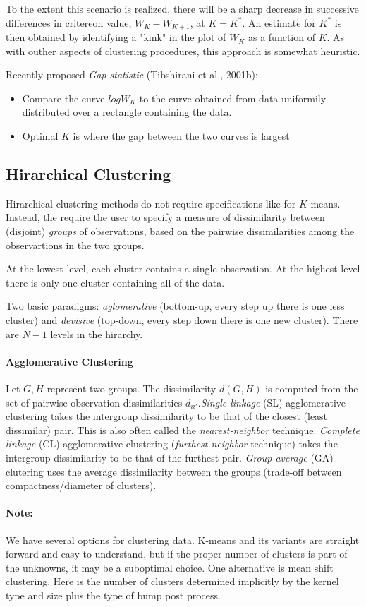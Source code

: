 To the extent this scenario is realized, there will be a sharp decrease in successive differences in critereon value, \(W_K - W_{K+1}\), at \(K=K^*\). An estimate for \(K^*\) is then obtained by identifying a "kink" in the plot of \(W_K\) as a function of \(K\). As with outher aspects of clustering procedures, this approach is somewhat heuristic.

Recently proposed \textit{Gap statistic} (Tibshirani et al., 2001b):
\begin{itemize}
    \item
        Compare the curve \(log W_K\) to the curve obtained from data uniformily distributed over a rectangle containing the data.
    \item
        Optimal \(K\) is where the gap between the two curves is largest
\end{itemize}

\subsection*{Hirarchical Clustering}
Hirarchical clustering methods do not require specifications like for \(K\)-means. Instead, the require the user to specify a measure of dissimilarity between (disjoint) \textit{groups} of observations, based on the pairwise dissimilarities among the observartions in the two groups.

At the lowest level, each cluster contains a single observation. At the highest level there is only one cluster containing all of the data.

Two basic paradigms: \textit{aglomerative} (bottom-up, every step up there is one less cluster) and \textit{devisive} (top-down, every step down there is one new cluster). There are \(N-1\) levels in the hirarchy.

\paragraph{Agglomerative Clustering}
Let \(G, H\) represent two groups. The dissimilarity \(d(G,H)\) is computed from the set of pairwise observation dissimilarities \(d_{ii'}\).\textit{Single linkage} (SL) agglomerative clustering takes the intergroup dissimilarity to be that of the closest (least dissimilar) pair. This is also often called the \textit{nearest-neighbor} technique. \textit{Complete linkage} (CL) agglomerative clustering (\textit{furthest-neighbor} technique) takes the intergroup dissimilarity to be that of the furthest pair. \textit{Group average} (GA) clutering uses the average dissimilarity between the groups (trade-off between compactness/diameter of clusters).

\paragraph{Note:}
We have several options for clustering data. K-means and its variants are straight forward and easy to understand, but if the proper number of clusters is part of the unknowns, it may be a suboptimal choice.
One alternative is mean shift clustering. Here is the number of clusters determined implicitly by the kernel type and size plus the type of bump post process.
